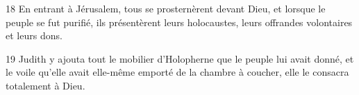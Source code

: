 
18 En entrant à Jérusalem, tous se prosternèrent devant Dieu, et lorsque le peuple se fut purifié, ils présentèrent leurs holocaustes, leurs offrandes volontaires et leurs dons.

19 Judith y ajouta tout le mobilier d'Holopherne que le peuple lui avait donné, et le voile qu'elle avait elle-même emporté de la chambre à coucher, elle le consacra totalement à Dieu.

